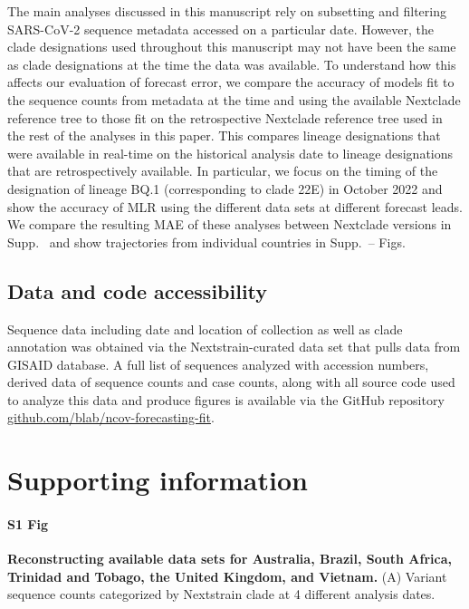 \documentclass[10pt,letterpaper]{article}
\begin{document}
The main analyses discussed in this manuscript rely on subsetting and filtering SARS-CoV-2 sequence metadata accessed on a particular date.
However, the clade designations used throughout this manuscript may not have been the same as clade designations at the time the data was available.
To understand how this affects our evaluation of forecast error, we compare the accuracy of models fit to the sequence counts from metadata at the time and using the available Nextclade reference tree to those fit on the retrospective Nextclade reference tree used in the rest of the analyses in this paper.
This compares lineage designations that were available in real-time on the historical analysis date to lineage designations that are retrospectively available.
In particular, we focus on the timing of the designation of lineage BQ.1 (corresponding to clade 22E) in October 2022 and show the accuracy of MLR using the different data sets at different forecast leads.
We compare the resulting MAE of these analyses between Nextclade versions in Supp.\   and show trajectories from individual countries in Supp.\ -- Figs.

\subsection*{Data and code accessibility}

Sequence data including date and location of collection as well as clade annotation was obtained via the Nextstrain-curated data set that pulls data from GISAID database.
A full list of sequences analyzed with accession numbers, derived data of sequence counts and case counts, along with all source code used to analyze this data and produce figures is available via the GitHub repository \href{https://github.com/blab/ncov-forecasting-fit}{github.com/blab/ncov-forecasting-fit}.


\section*{Supporting information}

\paragraph*{S1 Fig}
\label{fig:S1}
{\bf Reconstructing available data sets for Australia, Brazil, South Africa, Trinidad and Tobago, the United Kingdom, and Vietnam.}
(A) Variant sequence counts categorized by Nextstrain clade at 4 different analysis dates.
\end{document}

